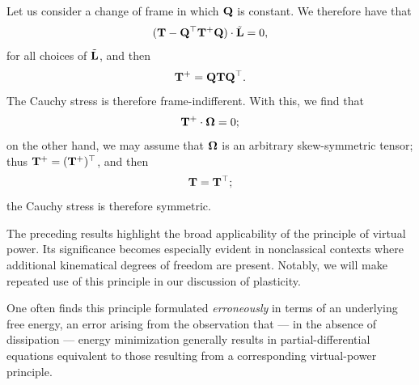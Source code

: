 Let us consider a change of frame in which $\mathbf{Q}$ is constant. We therefore have that
\begin{equation}
(\mathbf{T}-\mathbf{Q}^\top\mathbf{T}^+\mathbf{Q})\cdot\tilde{\mathbf{L}}=0,
\end{equation}
for all choices of $\tilde{\mathbf{L}}$, and then
\begin{equation}
	\mathbf{T}^+=\mathbf{Q}\mathbf{T}\mathbf{Q}^\top.
\end{equation}
The Cauchy stress is therefore frame-indifferent. With this, we find that
\begin{equation}
\mathbf{T}^+\cdot\bm{\Omega}=0;
\end{equation}
on the other hand,  we may assume that $\bm{\Omega}$ is an arbitrary skew-symmetric tensor; thus $\mathbf{T}^+=(\mathbf{T}^+)^\top$, and then
\begin{equation}
	\mathbf{T}=\mathbf{T}^\top;
\end{equation}
the Cauchy stress is therefore symmetric.

The preceding results highlight the broad applicability of the principle of virtual power. Its significance becomes especially evident in nonclassical contexts where additional kinematical degrees of freedom are present. Notably, we will make repeated use of this principle in our discussion of plasticity.

\begin{remark}
One often finds this principle formulated \textit{erroneously} in terms of an underlying free energy, an error
arising from the observation that — in the absence of dissipation — energy minimization generally
results in partial-differential equations equivalent to those resulting from a corresponding virtual-power principle.

\end{remark}



